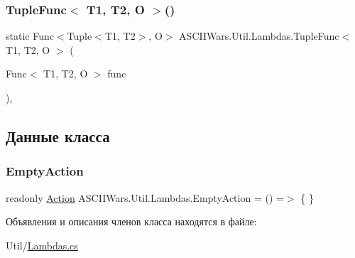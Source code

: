 \hypertarget{class_a_s_c_i_i_wars_1_1_util_1_1_lambdas_a99f022c2c1ad621c89644afac676c722}{}\label{class_a_s_c_i_i_wars_1_1_util_1_1_lambdas_a99f022c2c1ad621c89644afac676c722} 
\subsubsection{\texorpdfstring{Tuple\+Func$<$ T1, T2, O $>$()}{TupleFunc< T1, T2, O >()}}
{\footnotesize\ttfamily static Func$<$Tuple$<$T1, T2$>$, O$>$ A\+S\+C\+I\+I\+Wars.\+Util.\+Lambdas.\+Tuple\+Func$<$ T1, T2, O $>$ (\begin{DoxyParamCaption}\item[{Func$<$ T1, T2, O $>$}]{func }\end{DoxyParamCaption})\hspace{0.3cm}{\ttfamily [inline]}, {\ttfamily [static]}}



\subsection{Данные класса}
\hypertarget{class_a_s_c_i_i_wars_1_1_util_1_1_lambdas_aab7ecf777227e68d10c96568758f6782}{}\label{class_a_s_c_i_i_wars_1_1_util_1_1_lambdas_aab7ecf777227e68d10c96568758f6782} 
\subsubsection{\texorpdfstring{Empty\+Action}{EmptyAction}}
{\footnotesize\ttfamily readonly \hyperlink{class_a_s_c_i_i_wars_1_1_util_1_1_lambdas_a4bc80215a9cdc6519f88d7d73ef0a2d9}{Action} A\+S\+C\+I\+I\+Wars.\+Util.\+Lambdas.\+Empty\+Action = () =$>$ \{ \}\hspace{0.3cm}{\ttfamily [static]}}



Объявления и описания членов класса находятся в файле\+:\begin{DoxyCompactItemize}
\item 
Util/\hyperlink{_lambdas_8cs}{Lambdas.\+cs}\end{DoxyCompactItemize}
